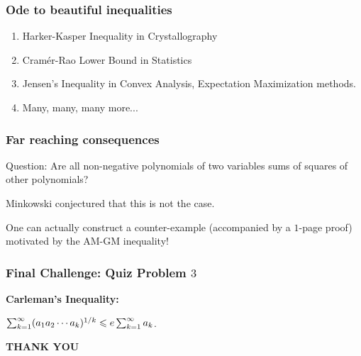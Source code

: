 \documentclass{beamer}
\begin{document}
\begin{frame}
\frametitle{Ode to beautiful inequalities}
\begin{enumerate}
\item Harker-Kasper Inequality in Crystallography
\pause
\item Cram\'{e}r-Rao Lower Bound in Statistics
\pause
\item Jensen's Inequality in Convex Analysis, Expectation Maximization methods.
\pause
\item Many, many, many more...
\end{enumerate}
\end{frame}

\begin{frame}
\frametitle{Far reaching consequences}
Question: Are all non-negative polynomials of two variables sums of squares of other polynomials?
\vspace*{0.2in}

Minkowski conjectured that this is {\color{red} not} the case. 

One can actually construct a counter-example (accompanied by a $1$-page proof) motivated by the AM-GM
inequality!
\end{frame}

\begin{frame}
\frametitle{Final Challenge: Quiz Problem $3$}
\bf{Carleman's Inequality}:
\begin{center}
$\sum_{k=1}^{\infty} (a_1 a_2 \cdots a_k)^{1/k} \leqslant e \sum_{k=1}^{\infty} a_k$.
\end{center}
\end{frame}

\begin{frame}
\begin{center}
{\bf THANK YOU}
\end{center}
\end{frame}
\end{document}
